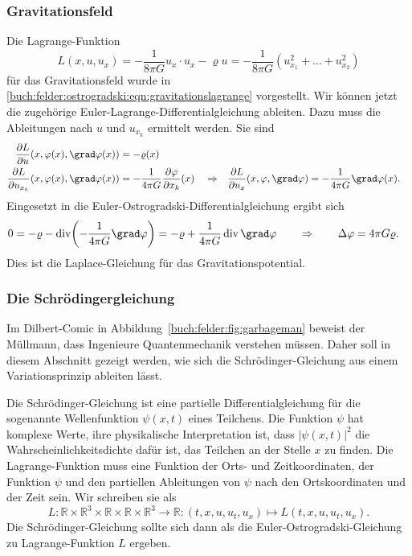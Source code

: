 %
%
\subsubsection{Gravitationsfeld}
Die Lagrange-Funktion
\[
L(x,u,u_x)
=
-\frac{1}{8\pi G}
u_x\cdot u_x 
-\varrho u
=
-\frac{1}{8\pi G}
(u_{x_1}^2 + \dots + u_{x_2}^2)
\]
für das Gravitationsfeld wurde in
\eqref{buch:felder:ostrogradski:eqn:gravitationslagrange}
vorgestellt.
Wir können jetzt die zugehörige Euler-Lagrange-Differentialgleichung
ableiten.
Dazu muss die Ableitungen nach $u$ und $u_{x_k}$ ermittelt werden.
Sie sind
\begin{align*}
\frac{\partial L}{\partial u}(x,\varphi(x),\grad\varphi(x))
&=
-\varrho(x)
\\
\frac{\partial L}{\partial u_{x_k}}(x,\varphi(x),\grad \varphi(x))
&=
-\frac{1}{4\pi G}\frac{\partial \varphi}{\partial x_k}(x)
&&\Rightarrow&
\frac{\partial L}{\partial u_x}(x,\varphi,\grad\varphi)
&=
-\frac{1}{4\pi G}\grad \varphi(x).
\end{align*}
Eingesetzt in die Euler-Ostrogradski-Differentialgleichung ergibt sich
\begin{align*}
0
&=
-\varrho
-
\operatorname{div} \biggl(-\frac{1}{4\pi G}\grad \varphi\biggr)
=
-\varrho + \frac{1}{4\pi G} \operatorname{div}\grad \varphi
\qquad\Rightarrow\qquad
\Delta \varphi = 4\pi G\varrho.
\end{align*}
Dies ist die Laplace-Gleichung für das Gravitationspotential.

%
%
\subsubsection{Die Schrödingergleichung}

Im Dilbert-Comic in Abbildung~\ref{buch:felder:fig:garbageman} beweist
der Müllmann, dass Ingenieure Quantenmechanik verstehen müssen.
Daher soll in diesem Abschnitt gezeigt werden, wie sich die
Schrödinger-Gleichung aus einem Variationsprinzip ableiten lässt.

Die Schrödinger-Gleichung ist eine partielle Differentialgleichung
für die sogenannte Wellenfunktion $\psi(x,t)$ eines Teilchens.
Die Funktion $\psi$ hat komplexe Werte, ihre physikalische
Interpretation ist, dass $|\psi(x,t)|^2$ die Wahrscheinlichkeitsdichte
dafür ist, das Teilchen an der Stelle $x$ zu finden.
Die Lagrange-Funktion muss eine Funktion der Orts- und Zeitkoordinaten,
der Funktion $\psi$ und den partiellen Ableitungen von $\psi$ nach
den Ortskoordinaten und der Zeit sein.
Wir schreiben sie als
\[
L
\colon
\mathbb{R}\times \mathbb{R}^3\times
\mathbb{R}\times
\mathbb{R}\times\mathbb{R}^3
\to\mathbb{R}
:
(t,x,u, u_t, u_x)
\mapsto
L(t,x,u, u_t, u_x).
\]
Die Schrödinger-Gleichung sollte sich dann als die Euler-Ostrogradski-Gleichung
zu La\-grange-Funktion $L$ ergeben.

